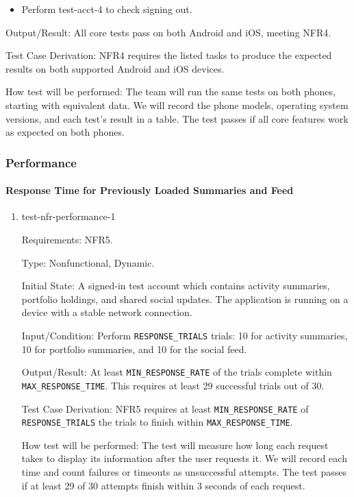 \documentclass[12pt, titlepage]{article}
\begin{document}
\begin{enumerate}
\begin{itemize}
    \item Perform test-acct-4 to check signing out.
\end{itemize}


Output/Result: All core tests pass on both Android and iOS, meeting NFR4.

Test Case Derivation: NFR4 requires the listed 
tasks to produce the expected results on both supported Android
and iOS devices.

How test will be performed: The team will run the same tests on both
phones, starting with equivalent data. We will record the phone models,
operating system versions, and each test's result in a table. The test
passes if all core features work as expected on both phones.

\end{enumerate}

\subsubsection{Performance}

\paragraph{Response Time for Previously Loaded Summaries and Feed}

\begin{enumerate}

\item{test-nfr-performance-1\\}

Requirements: NFR5.

Type: Nonfunctional, Dynamic.

Initial State: A signed-in test account which contains activity
summaries, portfolio holdings, and shared social updates. The application
is running on a device with a stable network connection.

Input/Condition: Perform \texttt{RESPONSE\_TRIALS}  trials:
10 for activity summaries, 10 for portfolio summaries, and 10
for the social feed.

Output/Result: At least \texttt{MIN\_RESPONSE\_RATE} 
of the trials complete within \texttt{MAX\_RESPONSE\_TIME}. This requires at least 29 successful trials out of 30.

Test Case Derivation: NFR5 requires at least
\texttt{MIN\_RESPONSE\_RATE} of \texttt{RESPONSE\_TRIALS}
the trials to finish within \texttt{MAX\_RESPONSE\_TIME}.


How test will be performed: The test will measure how long each request
takes to display its information after the user requests it. We will
record each time and count failures or timeouts as unsuccessful attempts.
The test passes if at least 29 of 30 attempts finish within 3 seconds
of each request.

\end{enumerate}
\end{document}
